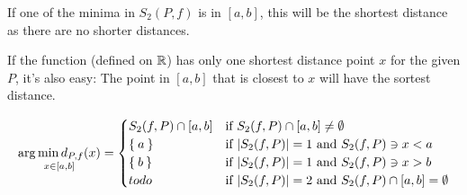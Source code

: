 If one of the minima in $S_2(P,f)$ is in $[a,b]$, this will be the
shortest distance as there are no shorter distances.


If the function (defined on $\mathbb{R}$) has only one shortest distance
point $x$ for the given $P$, it's also easy: The point in $[a,b]$ that
is closest to $x$ will have the sortest distance. 

\[\underset{x\in[a,b]}{\arg \min d_{P,f}(x)} = \begin{cases}
 S_2(f, P) \cap [a,b] &\text{if } S_2(f, P) \cap [a,b] \neq \emptyset \\
              \Set{a} &\text{if } |S_2(f, P)| = 1 \text{ and } S_2(f, P) \ni x < a\\
              \Set{b} &\text{if } |S_2(f, P)| = 1 \text{ and } S_2(f, P) \ni x > b\\
                 todo &\text{if } |S_2(f, P)| = 2 \text{ and } S_2(f, P) \cap [a,b] = \emptyset
    \end{cases}\]
